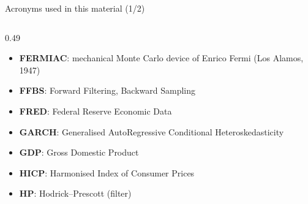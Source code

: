 \begin{frame}{Acronyms used in this material (1/2)}
\begin{columns}[T]
\begin{column}{0.49\textwidth}
\begin{itemize}
    \item \textbf{FERMIAC}: mechanical Monte Carlo device of Enrico Fermi (Los Alamos, 1947)
    \item \textbf{FFBS}: Forward Filtering, Backward Sampling
    \item \textbf{FRED}: Federal Reserve Economic Data
    \item \textbf{GARCH}: Generalised AutoRegressive Conditional Heteroskedasticity
    \item \textbf{GDP}: Gross Domestic Product
    \item \textbf{HICP}: Harmonised Index of Consumer Prices
    \item \textbf{HP}: Hodrick–Prescott (filter)
\end{itemize}
\end{column}
\end{columns}
\end{frame}
